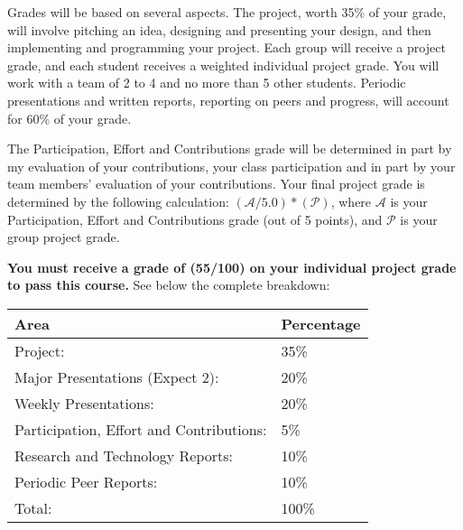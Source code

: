 Grades will be based on several aspects.
The project, worth 35\% of your grade, will involve pitching an idea, designing and presenting your design, and then implementing and programming your project. Each group will receive a project grade, and each student receives a weighted individual project grade.
You will work with a team of 2 to 4 and no more than 5 other students.
Periodic presentations and written reports, reporting on peers and progress, will account for 60\% of your grade.

The Participation, Effort and Contributions grade will be determined in part by my evaluation of your contributions, your class participation and in part by your team members' evaluation of your contributions.
Your final project grade is determined by the following calculation: $(\mathcal{A}/5.0)*(\mathcal{P})$, where $\mathcal{A}$ is your Participation, Effort and Contributions grade (out of 5 points), and $\mathcal{P}$ is your group project grade.

\textbf{You must receive a grade of (55/100) on your individual project grade to pass this course.} See below the complete breakdown:

\par\vspace{1cm}
\begin{tabular}{ @{}ll@{} }
    \toprule
        Area & Percentage \\
    \midrule
        Project: & 35\% \\
        Major Presentations (Expect 2): & 20\% \\
        Weekly Presentations: & 20\% \\
        Participation, Effort and Contributions: & 5\% \\
        Research and Technology Reports: & 10\% \\
        Periodic Peer Reports: & 10\% \\
        Total: & 100\% \\
    \bottomrule
\end{tabular}